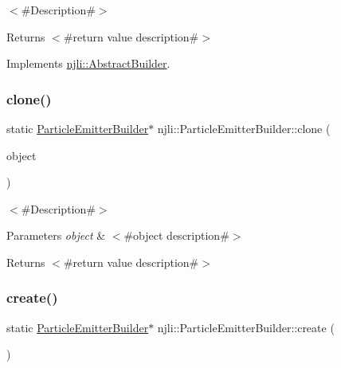 $<$\#\+Description\#$>$

\begin{DoxyReturn}{Returns}
$<$\#return value description\#$>$ 
\end{DoxyReturn}


Implements \mbox{\hyperlink{classnjli_1_1_abstract_builder_aa1d220053e182c37b31b427499c6eacf}{njli\+::\+Abstract\+Builder}}.

\mbox{\label{classnjli_1_1_particle_emitter_builder_aa233db2125a2dd99907dc35b56cda000}} 
\subsubsection{\texorpdfstring{clone()}{clone()}}
{\footnotesize\ttfamily static \mbox{\hyperlink{classnjli_1_1_particle_emitter_builder}{Particle\+Emitter\+Builder}}$\ast$ njli\+::\+Particle\+Emitter\+Builder\+::clone (\begin{DoxyParamCaption}\item[{const \mbox{\hyperlink{classnjli_1_1_particle_emitter_builder}{Particle\+Emitter\+Builder}} \&}]{object }\end{DoxyParamCaption})\hspace{0.3cm}{\ttfamily [static]}}

$<$\#\+Description\#$>$


\begin{DoxyParams}{Parameters}
{\em object} & $<$\#object description\#$>$\\
\hline
\end{DoxyParams}
\begin{DoxyReturn}{Returns}
$<$\#return value description\#$>$ 
\end{DoxyReturn}
\mbox{\label{classnjli_1_1_particle_emitter_builder_a9f350de3bd6d17484cbba9e1566ab04d}} 
\subsubsection{\texorpdfstring{create()}{create()}}
{\footnotesize\ttfamily static \mbox{\hyperlink{classnjli_1_1_particle_emitter_builder}{Particle\+Emitter\+Builder}}$\ast$ njli\+::\+Particle\+Emitter\+Builder\+::create (\begin{DoxyParamCaption}{ }\end{DoxyParamCaption})\hspace{0.3cm}{\ttfamily [static]}}

